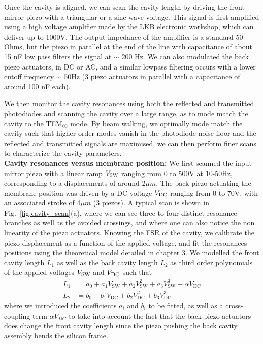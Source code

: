 Once the cavity is aligned, we can scan the cavity length by driving the front mirror piezo with a triangular or a sine wave voltage. This signal is first amplified using a high voltage amplifier made by the LKB electronic workshop, which can deliver up to 1000V. The output impedance of the amplifier is a standard 50 Ohms, but the piezo in parallel at the end of the line with capacitance of about 15 nF low pass filters the signal at  $\sim$ 200 Hz. We can also modulated the back piezo actuators, in DC or AC, and a similar lowpass filtering occurs with a lower cutoff frequency $\sim$ 50Hz (3 piezo actuators in parallel with a capacitance of around 100 nF each). 

We then monitor the cavity resonances using both the reflected and transmitted photodiodes and scanning the cavity over a large range, as to mode match the cavity to the TEM$_{00}$ mode. By beam walking, we optimally mode match the cavity such that higher order modes vanish in the photodiode noise floor and the reflected and transmitted signals are maximised, we can then perform finer scans to characterize the cavity parameters. \\

\noindent \textbf{Cavity resonances versus membrane position: } We first scanned the input mirror piezo with a linear ramp $V_{\rm SW}$ ranging from 0 to 500V at 10-50Hz, corresponding to a displacements of around 2$\mu m$. The back piezo actuating the membrane position was driven by a DC voltage $V_{\rm DC}$ ranging from 0 to 70V, with an associated stroke of 4$\mu m$ (3 piezos). A typical scan is shown in Fig.~\ref{fig:cavity_scan}(a), where we can see three to four distinct resonance branches as well as the avoided crossings, and where one can also notice the non linearity of the piezo actuators. Knowing the FSR of the cavity, we calibrate the piezo displacement as a function of the applied voltage, and fit the resonances positions using the theoretical model detailed in chapter 3. We modelled the front cavity length $L_1$ as well as the back cavity length $L_2$ as third order polynomials of the applied voltages $V_{\rm SW}$ and $V_{\rm DC}$  such that
\begin{equation}
  \begin{split}
    L_1 &= a_0 + a_1 V_{\mathrm{SW}} + a_2 V_{\mathrm{SW}}^2 + a_3 V_{\mathrm{SW}}^3 - \alpha V_{\mathrm{DC}}\\
    L_2 &= b_0 + b_1 V_{\mathrm{DC}} + b_2 V_{\mathrm{DC}}^2 + b_3 V_{\mathrm{DC}}^3
  \end{split}
\end{equation} 
where we introduced the coefficients $a_i$ and $b_i$ to be fitted, as well as a cross-coupling term $\alpha V_{DC}$ to take into account the fact that the back piezo actuators does change the front cavity length since the piezo pushing the back cavity assembly bends the silicon frame. \\

